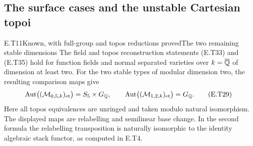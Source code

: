 \subsection{The surface cases and the unstable Cartesian topoi}

\begin{result}{E.T11}{Known, with full-group and topos reductions proved}{The two remaining stable dimensions}
The field and topos reconstruction statements (E.T33) and (E.T35)
hold for function fields and normal separated varieties over
$k=\overline{\mathbb Q}$ of dimension at least two.  For the two stable
types of modular dimension two, the resulting comparison maps give
\[
 \operatorname{Aut}\bigl((\mathcal M_{0,5,k})_{\mathrm{et}}\bigr)
       =S_5\times G_{\mathbb Q},\qquad
 \operatorname{Aut}\bigl((\mathcal M_{1,2,k})_{\mathrm{et}}\bigr)=G_{\mathbb Q}.
                                                               \tag{E.T29}
\]
Here all topos equivalences are unringed and taken modulo natural
isomorphism.  The displayed maps are relabelling and semilinear
base change.  In the second formula the relabelling transposition
is naturally isomorphic to the identity algebraic stack functor,
as computed in E.T4.
\end{result}
